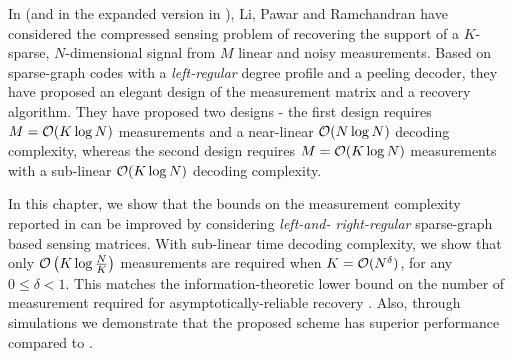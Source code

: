 In \cite{li2015subisit} (and in the expanded version in \cite{li2015subdraft}), Li, Pawar and Ramchandran have considered the compressed sensing problem of recovering the support of a $K$-sparse, $N$-dimensional signal from $M$ linear and noisy measurements. Based on sparse-graph codes with a \emph{left-regular} degree profile and a peeling decoder, they have proposed an elegant design of the measurement matrix and a recovery algorithm. They have proposed two designs - the first design requires $M = \mathcal{O}(K \log N)$ measurements and a near-linear $\mathcal{O}(N \log N)$ decoding complexity, whereas the second design requires $M = \mathcal{O}(K \log N)$ measurements with a sub-linear $\mathcal{O}(K \log N)$ decoding complexity.

In this chapter, we show that the bounds on the measurement complexity reported in \cite{li2015subisit,li2015subdraft} can be improved by considering \emph{left-and- right-regular} sparse-graph based sensing matrices. With sub-linear time decoding complexity, we show that only $\mathcal{O}\left(K \log \frac{N}{K} \right)$ measurements are required when $K = \mathcal{O}(N^\delta)$, for any $0 \leq \delta < 1$.  This matches the information-theoretic lower bound on the number of measurement required for asymptotically-reliable recovery \cite{wainwright2009information}. Also, through simulations we demonstrate that the proposed scheme has superior performance compared to \cite{li2015subdraft}.

